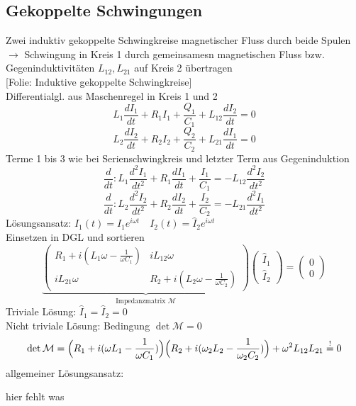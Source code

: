 \documentclass[titlepage,12pt,a4paper,ngerman]{report}
\newcommand{\tx}[1]{\textrm{#1}}
\newcommand{\ub}[1]{\underbrace{#1}}
\newcommand{\folie}[1]{\color{gray}[Folie: #1]\color{black}}
\begin{document}
\subsection{Gekoppelte Schwingungen}
Zwei induktiv gekoppelte Schwingkreise magnetischer Fluss durch beide Spulen\\
$ \rightarrow $ Schwingung in Kreis 1 durch gemeinsamesn magnetischen Fluss bzw. Gegeninduktivitäten $ L_{12},L_{21} $ auf Kreis 2 übertragen\\
\folie{Induktive gekoppelte Schwingkreise}\\[10pt]
Differentialgl. aus Maschenregel in Kreis 1 und 2
$$ L_{1} \frac{d I_1}{dt} + R_1 I_1 + \frac{Q_1}{C_1} + L_{12}\frac{dI_2}{dt} = 0$$
$$ L_{2} \frac{d I_2}{dt} + R_2 I_2 + \frac{Q_2}{C_2} + L_{21}\frac{dI_1}{dt} = 0$$
Terme 1 bis 3 wie bei Serienschwingkreis und letzter Term aus Gegeninduktion\\
$$\frac{d}{dt}: L_1 \frac{d^2I_1}{dt^2} + R_1 \frac{dI_1}{dt} + \frac{I_1}{C_1} = - L_{12} \frac{d^2 I_2}{dt^2}$$
$$\frac{d}{dt}: L_2 \frac{d^2I_2}{dt^2} + R_2 \frac{dI_2}{dt} + \frac{I_2}{C_2} = - L_{21} \frac{d^2 I_1}{dt^2}$$
Lösungsansatz: $ I_1(t) = \hat{I}_1 e^{i\omega t} \quad I_2(t) = \hat{I}_2 e ^{i \omega t} $\\
Einsetzen in DGL und sortieren
$$\ub{\begin{pmatrix}
R_1 + i (L_1 \omega - \frac{1}{\omega C_1}) & i L_{12} \omega \\
i L_{21} \omega & R_2 + i(L_2\omega - \frac{1}{\omega C_2})
\end{pmatrix}}_{\tx{Impedanzmatrix } \mathcal{M}} \begin{pmatrix}
\hat{I}_1\\
\hat{I}_2
\end{pmatrix} = \begin{pmatrix}
0 \\ 0
\end{pmatrix}$$
Triviale Lösung: $ \hat{I}_1 = \hat{I}_2 = 0 $\\
Nicht triviale Lösung: Bedingung $ \det \mathcal{M} = 0 $\\
$$\det \mathcal{M} = \Big(R_1 + i(\omega L_1 - \frac{1}{\omega C_1}) \Big)\Big(R_2 + i(\omega_2 L_2 - \frac{1}{\omega_2 C_2})\Big) + \omega^2 L_{12} L_{21} \buildrel ! \over = 0 $$
allgemeiner Lösungsansatz:


hier fehlt was

\end{document}
